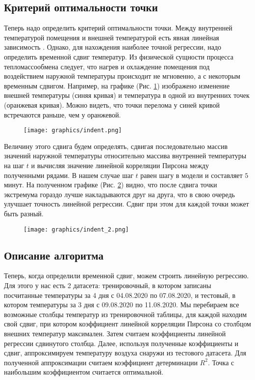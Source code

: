 \newpage


\subsection{Критерий оптимальности точки}
\label{algo-2}

Теперь надо определить критерий оптимальности точки. Между внутренней температурой помещения и внешней температурой есть явная линейная зависимость \cite{pashchenko-rassadin}. Однако, для нахождения наиболее точной регрессии, надо определить временной сдвиг температур. Из физической сущности процесса тепломассообмена следует, что нагрев и охлаждение помещения под воздействием наружной температуры происходит не мгновенно, а с некоторым временным сдвигом. Например, на графике (Рис. \ref{indent1}) изображено изменение внешней температуры (синяя кривая) и температура в одной из внутренних точек (оранжевая кривая). Можно видеть, что точки перелома у синей кривой встречаются раньше, чем у оранжевой.

\begin{figure}[H]
\texttt{[image: graphics/indent.png]}
\caption{}
\label{indent1}
\end{figure}

\newpage

Величину этого сдвига будем определять, сдвигая последовательно массив значений наружной температуры относительно массива внутренней температуры на шаг $t$ и вычисляя значение линейной корреляции Пирсона \cite{pearson} между полученными рядами. В нашем случае шаг $t$ равен шагу в модели и составляет $5$ минут. На полученном графике (Рис. \ref{indent2}) видно, что после сдвига точки экстремума гораздо лучше накладываются друг на друга, что в свою очередь улучшает точность линейной регрессии. Сдвиг при этом для каждой точки может быть разный.

\begin{figure}[H]
\texttt{[image: graphics/indent\_2.png]}
\caption{}
\label{indent2}
\end{figure}

\newpage 


\subsection{Описание алгоритма}

Теперь, когда определили временной сдвиг, можем строить линейную регрессию. Для этого у нас есть 2 датасета: тренировочный, в котором записаны посчитанные температуры за 4 дня с 04.08.2020 по 07.08.2020, и тестовый, в котором температуры за 3 дня с 09.08.2020 по 11.08.2020. Мы перебираем все возможные столбцы температур из тренировочной таблицы, для каждой находим свой сдвиг, при котором коэффициент линейной корреляции Пирсона со столбцом внешних температур максимален. Затем считаем коэффициенты линейной регрессии сдвинутого столбца. Далее, используя полученные коэффициенты и сдвиг, аппроксимируем температуру воздуха снаружи из тестового датасета. Для полученной аппроксимации считаем коэффициент детерминации $R^2$. Точка с наибольшим коэффициентом считается оптимальной.

